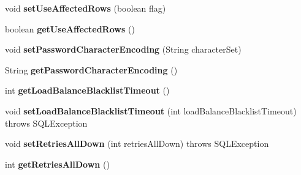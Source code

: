 \begin{DoxyCompactItemize}
void {\bfseries set\+Use\+Affected\+Rows} (boolean flag)
\item 
\mbox{\label{interfacecom_1_1mysql_1_1jdbc_1_1_connection_properties_a9d88c5b26ce125ef295063aeb4f5cb96}} 
boolean {\bfseries get\+Use\+Affected\+Rows} ()
\item 
\mbox{\label{interfacecom_1_1mysql_1_1jdbc_1_1_connection_properties_a3c3a91dffa5687ef0ad19acc55b3d588}} 
void {\bfseries set\+Password\+Character\+Encoding} (String character\+Set)
\item 
\mbox{\label{interfacecom_1_1mysql_1_1jdbc_1_1_connection_properties_aa818360303b809410eb7df526f28a073}} 
String {\bfseries get\+Password\+Character\+Encoding} ()
\item 
\mbox{\label{interfacecom_1_1mysql_1_1jdbc_1_1_connection_properties_aca5f501eeed52937cb3842c0d3cb62eb}} 
int {\bfseries get\+Load\+Balance\+Blacklist\+Timeout} ()
\item 
\mbox{\label{interfacecom_1_1mysql_1_1jdbc_1_1_connection_properties_a82264b819f52fc86e878ec61bd43090c}} 
void {\bfseries set\+Load\+Balance\+Blacklist\+Timeout} (int load\+Balance\+Blacklist\+Timeout)  throws S\+Q\+L\+Exception
\item 
\mbox{\label{interfacecom_1_1mysql_1_1jdbc_1_1_connection_properties_ab2f1195a87d5fd39c1ef6425f64737f9}} 
void {\bfseries set\+Retries\+All\+Down} (int retries\+All\+Down)  throws S\+Q\+L\+Exception
\item 
\mbox{\label{interfacecom_1_1mysql_1_1jdbc_1_1_connection_properties_a1aa72e3a997c1af5781c753873a0b24c}} 
int {\bfseries get\+Retries\+All\+Down} ()
\item 
\mbox{\label{interfacecom_1_1mysql_1_1jdbc_1_1_connection_properties_a75e5db8014d399637ad9b47bca0871c4}} 

\end{DoxyCompactItemize}
